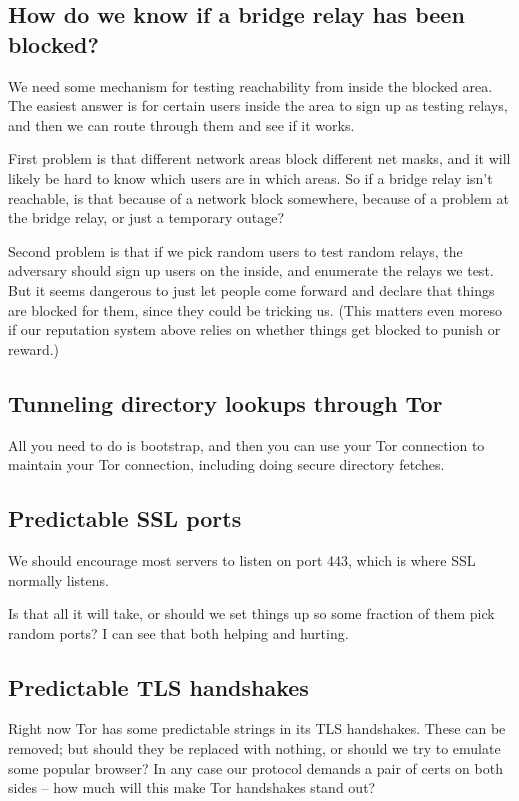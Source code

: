 \documentclass{llncs}
\begin{document}
\subsection{How do we know if a bridge relay has been blocked?}

We need some mechanism for testing reachability from inside the
blocked area. The easiest answer is for certain users inside
the area to sign up as testing relays, and then we can route through
them and see if it works.

First problem is that different network areas block different net masks,
and it will likely be hard to know which users are in which areas. So
if a bridge relay isn't reachable, is that because of a network block
somewhere, because of a problem at the bridge relay, or just a temporary
outage?

Second problem is that if we pick random users to test random relays, the
adversary should sign up users on the inside, and enumerate the relays
we test. But it seems dangerous to just let people come forward and
declare that things are blocked for them, since they could be tricking
us. (This matters even moreso if our reputation system above relies on
whether things get blocked to punish or reward.)




\subsection{Tunneling directory lookups through Tor}

All you need to do is bootstrap, and then you can use
your Tor connection to maintain your Tor connection,
including doing secure directory fetches.

\subsection{Predictable SSL ports}

We should encourage most servers to listen on port 443, which is
where SSL normally listens.

Is that all it will take, or should we set things up so some fraction
of them pick random ports? I can see that both helping and hurting.

\subsection{Predictable TLS handshakes}

Right now Tor has some predictable strings in its TLS handshakes.
These can be removed; but should they be replaced with nothing, or
should we try to emulate some popular browser? In any case our
protocol demands a pair of certs on both sides -- how much will this
make Tor handshakes stand out?
\end{document}
